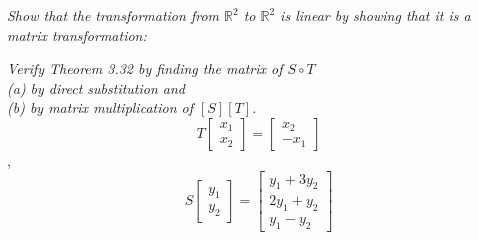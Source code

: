 \documentclass[12pt,letterpaper]{hmcpset}
\newcommand\tab[1][1cm]{\hspace*{#1}}
\begin{document}
\begin{solution}
    
\end{solution}

\newpage


\begin{problem}[3.6.16]
    \textit{Show that the transformation from $\mathbb{R}^2$ to $\mathbb{R}^2$ is linear by showing that it is a matrix transformation:}
    
\end{problem}

\begin{solution}
    
\end{solution}

\newpage


\begin{problem}[3.6.32]
    \textit{Verify Theorem 3.32 by finding the matrix of $S \circ T$ \\ \tab \tab (a) by direct substitution and 
    \\ \tab \tab (b) by matrix multiplication of $[S] [T]$.} 
	\[
    T\begin{bmatrix}
    x_1 \\ x_2
    \end{bmatrix}= 
    \begin{bmatrix}
    x_2 \\ -x_1
    \end{bmatrix}
    \],
    \[
    S\begin{bmatrix}
    y_1 \\ y_2
    \end{bmatrix}= 
    \begin{bmatrix}
    y_1 + 3y_2 \\ 2y_1 + y_2 \\ y_1 - y_2
    \end{bmatrix}
    \]
\end{problem}

\begin{solution}
    
\end{solution}

\newpage

\end{document}
